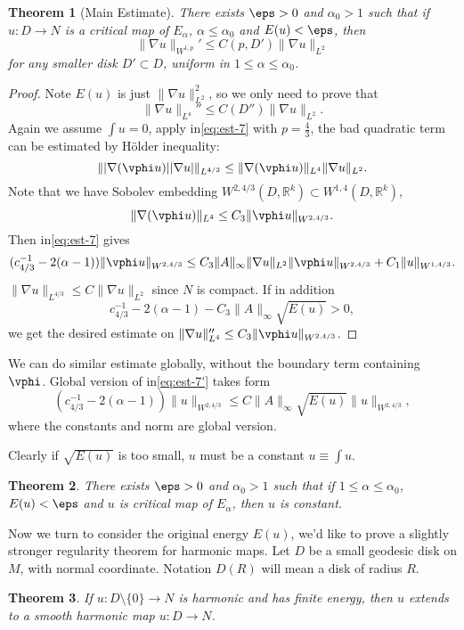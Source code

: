 \documentclass[UTF8,12pt]{article}
\theoremstyle{plain}\newtheorem{theorem}{Theorem}
\theoremstyle{definition}\newtheorem{definition}[theorem]{Definition}
\theoremstyle{definition}\newtheorem{example}[theorem]{Example}
\theoremstyle{plain}\newtheorem{axiom}[theorem]{Axiom}
\theoremstyle{plain}\newtheorem{assertion}[theorem]{Assertion}
\theoremstyle{plain}\newtheorem{corollary}[theorem]{Corollary}
\theoremstyle{plain}\newtheorem{lemma}[theorem]{Lemma}
\theoremstyle{plain}\newtheorem{proposition}[theorem]{Proposition}
\theoremstyle{plain}\newtheorem{prop}[theorem]{Proposition}
\theoremstyle{plain}\newtheorem{conjecture}[theorem]{Conjecture}
\theoremstyle{plain}\newtheorem{conj}[theorem]{Conjecture}
\theoremstyle{plain}\newtheorem{problem}[theorem]{Problem}
\theoremstyle{remark}\newtheorem{notation}[theorem]{Notation}
\theoremstyle{definition}\newtheorem*{question}{Question}
\theoremstyle{definition}\newtheorem*{answer}{Answer}
\theoremstyle{definition}\newtheorem*{goal}{Goal}
\theoremstyle{plain}\newtheorem*{application}{Application}
\theoremstyle{plain}\newtheorem*{exercise}{Exercise}
\theoremstyle{remark}\newtheorem*{remark}{Remark}
\theoremstyle{remark}\newtheorem*{note}{\small{Note}}
\numberwithin{equation}{section}
\numberwithin{theorem}{section}
\numberwithin{figure}{section}
\begin{document}
\begin{theorem}[Main Estimate]\label{thm:main-est}
    There exists \(\eps>0\) and \(\alpha_0>1\) such that if \(u\colon D\to N\)
    is a critical map of \(E_\alpha\), \(\alpha\le\alpha_0\) and \(E(u)<\eps\), then \[
        \|\nabla u\|_{W^{1,p}}'\le C(p,D')\|\nabla u\|_{L^2}
    \] for any smaller disk \(D'\subset D\), uniform in \(1\le \alpha\le\alpha_0\).
\end{theorem}
\begin{proof}
    Note \(E(u)\) is just \(\|\nabla u\|_{L^2}^2\), so we only need to prove that \[
        \|\nabla u\|_{L^4}''\le C(D'')\|\nabla u\|_{L^2}
    .\] Again we assume \(\int u=0\), apply in\cref{eq:est-7} with \(p=\frac{4}{3}\),
    the bad quadratic term can be estimated by H\"older inequality: \[
        \||\nabla(\vphi u)||\nabla u|\|_{L^{4/3}}
        \le \|\nabla(\vphi u)\|_{L^4}\|\nabla u\|_{L^2}
    .\] Note that we have Sobolev embedding \(W^{2,4/3}(D,\mathbb{R}^k)
    \subset W^{1,4}(D,\mathbb{R}^k)\), \ie\ \[
        \|\nabla(\vphi u)\|_{L^4}\le C_3\|\vphi u\|_{W^{2,4/3}}
    .\] Then in\cref{eq:est-7} gives
    \begin{equation}\label{eq:est-7'}
    (c_{4/3}^{-1}-2(\alpha-1))\|\vphi u\|_{W^{2,4/3}}
    \le C_3\|A\|_{\infty}\|\nabla u\|_{L^2}\|\vphi u\|_{W^{2,4/3}}
    +C_1\|u\|_{W^{1,4/3}}
    .\end{equation}
    \(\|\nabla u\|_{L^{4/3}}\le C\|\nabla u\|_{L^2}\) since \(N\) is
    compact. If in addition \[
        c_{4/3}^{-1}-2(\alpha-1)-C_3\|A\|_{\infty}\sqrt{E(u)}>0
    ,\] we get the desired estimate on \(\|\nabla u\|_{L^4}''\le C_3\|\vphi u\|
    _{W^{2,4/3}}\).
\end{proof}
We can do similar estimate globally, without the boundary term containing \(\vphi\).
Global version of in\cref{eq:est-7'} takes form \[
    (c_{4/3}^{-1}-2(\alpha-1))\|u\|_{W^{2,4/3}}
    \le C\|A\|_{\infty}\sqrt{E(u)}\|u\|_{W^{2,4/3}}
,\] where the constants and norm are global version.

Clearly if \(\sqrt{E(u)}\) is too small, \(u\) must be a constant
\(u\equiv\int u\).
\begin{theorem}\label{thm:energy-gap}
    There exists \(\eps>0\) and \(\alpha_0>1\) such that if \(1\le\alpha\le\alpha_0\),
    \(E(u)<\eps\) and \(u\) is critical map of \(E_\alpha\), then \(u\) is constant.
\end{theorem}

Now we turn to consider the original energy \(E(u)\), we'd like to prove a slightly
stronger regularity theorem for harmonic maps. Let \(D\) be a small geodesic disk
on \(M\), with normal coordinate. Notation \(D(R)\) will mean a disk of radius \(R\).
\begin{theorem}\label{thm:removable-singularity}
    If \(u\colon D\setminus\{0\}\to N\) is harmonic and has finite energy, then
    \(u\) extends to a smooth harmonic map \(u\colon D\to N\).
\end{theorem}
\end{document}
